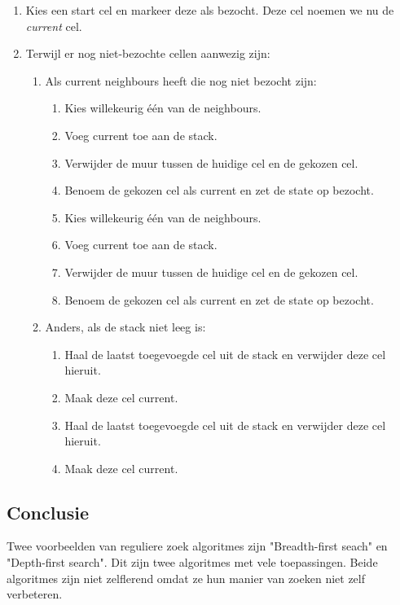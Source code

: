 \begin{enumerate}
\item Kies een start cel en markeer deze als bezocht. Deze cel noemen we nu de \textit{current} cel.
\item Terwijl er nog niet-bezochte cellen aanwezig zijn:
	\begin{enumerate}
	\item Als current neighbours heeft die nog niet bezocht zijn:
		\begin{enumerate}
		\item Kies willekeurig \'e\'en van de neighbours.
		\item Voeg current toe aan de stack.
		\item Verwijder de muur tussen de huidige cel en de gekozen cel.
		\item Benoem de gekozen cel als current en zet de state op bezocht.
		\item Kies willekeurig \'e\'en van de neighbours.
		\item Voeg current toe aan de stack.
		\item Verwijder de muur tussen de huidige cel en de gekozen cel.
		\item Benoem de gekozen cel als current en zet de state op bezocht.
		\end{enumerate}			
	\item Anders, als de stack niet leeg is:
		\begin{enumerate}
		\item Haal de laatst toegevoegde cel uit de stack en verwijder deze cel hieruit.
		\item Maak deze cel current.
		\item Haal de laatst toegevoegde cel uit de stack en verwijder deze cel hieruit.
		\item Maak deze cel current.
		\end{enumerate}	
	\end{enumerate}
\end{enumerate}

\subsection{Conclusie}
Twee voorbeelden van reguliere zoek algoritmes zijn "Breadth-first seach" en  "Depth-first search". Dit zijn twee algoritmes met vele toepassingen. Beide algoritmes zijn niet zelflerend omdat ze hun manier van zoeken niet zelf verbeteren.